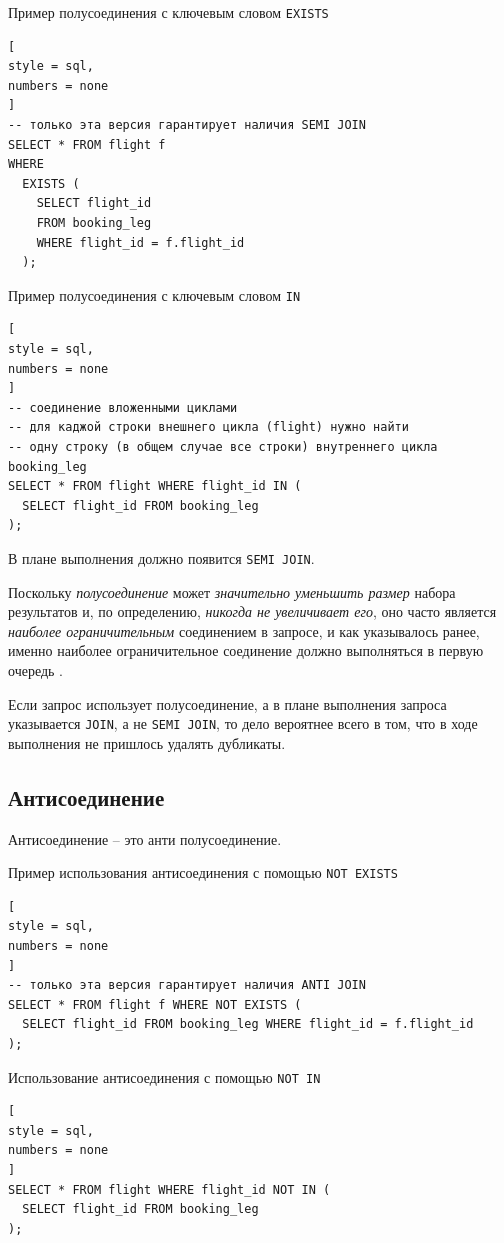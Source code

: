 \documentclass[%
	11pt,
	a4paper,
	utf8,
		]{article}
\begin{document}
Пример полусоединения с ключевым словом \verb|EXISTS|
\begin{lstlisting}[
style = sql,
numbers = none	
]
-- только эта версия гарантирует наличия SEMI JOIN
SELECT * FROM flight f
WHERE 
  EXISTS (
    SELECT flight_id
    FROM booking_leg
    WHERE flight_id = f.flight_id
  );
\end{lstlisting}

Пример полусоединения с ключевым словом \verb|IN|
\begin{lstlisting}[
style = sql,
numbers = none	
]
-- соединение вложенными циклами
-- для каджой строки внешнего цикла (flight) нужно найти
-- одну строку (в общем случае все строки) внутреннего цикла booking_leg
SELECT * FROM flight WHERE flight_id IN (
  SELECT flight_id FROM booking_leg
);
\end{lstlisting}

В плане выполнения должно появится \verb|SEMI JOIN|.

Поскольку \emph{полусоединение} может \emph{значительно уменьшить размер} набора результатов и, по определению, \emph{\color{blue}никогда не увеличивает его}, оно часто является \emph{наиболее ограничительным} соединением в запросе, и как указывалось ранее, именно наиболее ограничительное соединение должно выполняться в первую очередь \cite[]{dombrovskaya:postgresql-2022}.

Если запрос использует полусоединение, а в плане выполнения запроса указывается \verb|JOIN|, а не \verb|SEMI JOIN|, то дело вероятнее всего в том, что в ходе выполнения не пришлось удалять дубликаты.

\subsection{Антисоединение}

Антисоединение -- это анти полусоединение.

Пример использования антисоединения с помощью \verb|NOT EXISTS|
\begin{lstlisting}[
style = sql,
numbers = none	
]
-- только эта версия гарантирует наличия ANTI JOIN
SELECT * FROM flight f WHERE NOT EXISTS (
  SELECT flight_id FROM booking_leg WHERE flight_id = f.flight_id
);
\end{lstlisting}

Использование антисоединения с помощью \verb|NOT IN|
\begin{lstlisting}[
style = sql,
numbers = none
]
SELECT * FROM flight WHERE flight_id NOT IN (
  SELECT flight_id FROM booking_leg
);
\end{lstlisting}
\end{document}
